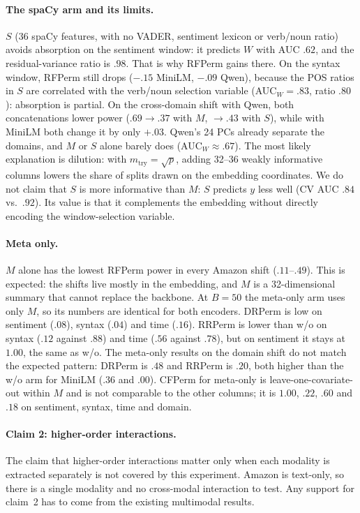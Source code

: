 \documentclass[11pt]{article}
\begin{document}
\paragraph{The spaCy arm and its limits.}
$S$ (36 spaCy features, with no VADER, sentiment lexicon or verb/noun ratio) avoids absorption on the
sentiment window: it predicts $W$ with AUC $.62$, and the residual-variance ratio is $.98$.
That is why RFPerm gains there.
On the syntax window, RFPerm still drops ($-.15$ MiniLM, $-.09$ Qwen), because the POS ratios in $S$
are correlated with the verb/noun selection variable (AUC$_W=.83$, ratio $.80$): absorption is partial.
On the cross-domain shift with Qwen, both concatenations lower power
($.69\to.37$ with $M$, $\to.43$ with $S$), while with MiniLM both change it by only $+.03$.
Qwen's 24 PCs already separate the domains, and $M$ or $S$ alone barely does (AUC$_W\approx.67$).
The most likely explanation is dilution: with $m_{\mathrm{try}}=\sqrt p$, adding 32--36 weakly
informative columns lowers the share of splits drawn on the embedding coordinates.
We do not claim that $S$ is more informative than $M$: $S$ predicts $y$ less well
(CV AUC $.84$ vs.\ $.92$).
Its value is that it complements the embedding without directly encoding the window-selection variable.

\paragraph{Meta only.}
$M$ alone has the lowest RFPerm power in every Amazon shift ($.11$--$.49$).
This is expected: the shifts live mostly in the embedding, and $M$ is a 32-dimensional summary that
cannot replace the backbone.
At $B{=}50$ the meta-only arm uses only $M$, so its numbers are identical for both encoders.
DRPerm is low on sentiment ($.08$), syntax ($.04$) and time ($.16$).
RRPerm is lower than w/o on syntax ($.12$ against $.88$) and time ($.56$ against $.78$), but on sentiment it
stays at $1.00$, the same as w/o.
The meta-only results on the domain shift do not match the expected pattern: DRPerm is $.48$ and RRPerm
is $.20$, both higher than the w/o arm for MiniLM ($.36$ and $.00$).
CFPerm for meta-only is leave-one-covariate-out within $M$ and is not comparable to the other columns;
it is $1.00$, $.22$, $.60$ and $.18$ on sentiment, syntax, time and domain.

\paragraph{Claim 2: higher-order interactions.}
The claim that higher-order interactions matter only when each modality is extracted separately
is not covered by this experiment.
Amazon is text-only, so there is a single modality and no cross-modal interaction to test.
Any support for claim~2 has to come from the existing multimodal results.
\end{document}
